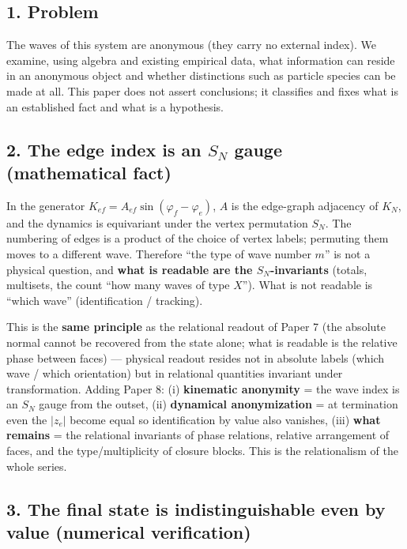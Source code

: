 \documentclass[
  a4paper,
]{ltjsarticle}
\begin{document}
\subsection{1. Problem}\label{problem}

The waves of this system are anonymous (they carry no external index).
We examine, using algebra and existing empirical data, what information
can reside in an anonymous object and whether distinctions such as
particle species can be made at all. This paper does not assert
conclusions; it classifies and fixes what is an established fact and
what is a hypothesis.

\subsection{\texorpdfstring{2. The edge index is an \(S_N\) gauge
(mathematical
fact)}{2. The edge index is an S\_N gauge (mathematical fact)}}\label{the-edge-index-is-an-s_n-gauge-mathematical-fact}

In the generator \(K_{ef}=A_{ef}\sin(\varphi_f-\varphi_e)\), \(A\) is
the edge-graph adjacency of \(K_N\), and the dynamics is equivariant
under the vertex permutation \(S_N\). The numbering of edges is a
product of the choice of vertex labels; permuting them moves to a
different wave. Therefore ``the type of wave number \(m\)'' is not a
physical question, and \textbf{what is readable are the
\(S_N\)-invariants} (totals, multisets, the count ``how many waves of
type \(X\)''). What is not readable is ``which wave'' (identification /
tracking).

This is the \textbf{same principle} as the relational readout of Paper 7
(the absolute normal cannot be recovered from the state alone; what is
readable is the relative phase between faces) --- physical readout
resides not in absolute labels (which wave / which orientation) but in
relational quantities invariant under transformation. Adding Paper 8:
(i) \textbf{kinematic anonymity} = the wave index is an \(S_N\) gauge
from the outset, (ii) \textbf{dynamical anonymization} = at termination
even the \(|z_e|\) become equal so identification by value also
vanishes, (iii) \textbf{what remains} = the relational invariants of
phase relations, relative arrangement of faces, and the
type/multiplicity of closure blocks. This is the relationalism of the
whole series.

\subsection{3. The final state is indistinguishable even by value
(numerical
verification)}\label{the-final-state-is-indistinguishable-even-by-value-numerical-verification}
\end{document}
